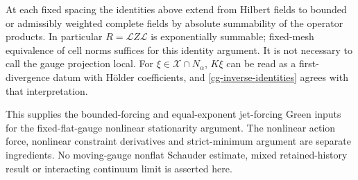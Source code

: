 At each fixed spacing the identities above extend from Hilbert
fields to bounded or admissibly weighted complete fields by
absolute summability of the operator products. In particular
$R=\mathcal LZ\mathcal L$ is exponentially summable; fixed-mesh
equivalence of cell norms suffices for this identity argument.
It is not necessary to call the gauge projection local.
For $\xi\in\mathcal X\cap N_\alpha$, $K\xi$ can be read as
a first-divergence datum with H\"older coefficients, and
\eqref{cg-inverse-identities} agrees with that interpretation.

This supplies the bounded-forcing and equal-exponent jet-forcing
Green inputs for the fixed-flat-gauge nonlinear stationarity
argument. The nonlinear action force, nonlinear constraint
derivatives and strict-minimum argument are separate ingredients.
No moving-gauge nonflat Schauder estimate, mixed retained-history
result or interacting continuum limit is asserted here.
